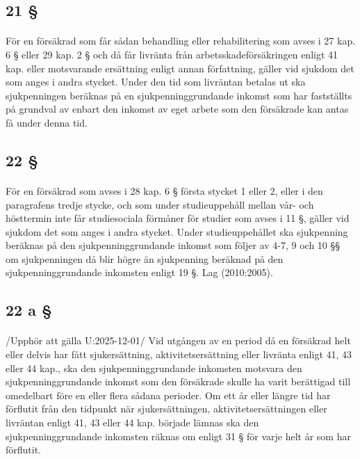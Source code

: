 \documentclass[a4paper,notitlepage,openany,10pt]{book}
\begin{document}
\subsection*{21 §}
\paragraph*{}
För en försäkrad som får sådan behandling eller rehabilitering som avses i 27 kap. 6 § eller 29 kap. 2 § och då får livränta från arbetsskadeförsäkringen enligt 41 kap.
eller motsvarande ersättning enligt annan författning, gäller vid sjukdom det som anges i andra stycket.
Under den tid som livräntan betalas ut ska sjukpenningen beräknas på en sjukpenninggrundande inkomst som har fastställts på grundval av enbart den inkomst av eget arbete som den försäkrade kan antas få under denna tid.
\subsection*{22 §}
\paragraph*{}
För en försäkrad som avses i 28 kap. 6 § första stycket 1 eller 2, eller i den paragrafens tredje stycke, och som under studieuppehåll mellan vår- och hösttermin inte får studiesociala förmåner för studier som avses i 11 §, gäller vid sjukdom det som anges i andra stycket.
Under studieuppehållet ska sjukpenning beräknas på den sjukpenninggrundande inkomst som följer av 4-7, 9 och 10 §§ om sjukpenningen då blir högre än sjukpenning beräknad på den sjukpenninggrundande inkomsten enligt 19 §.
Lag (2010:2005).
\subsection*{22 a §}
\paragraph*{}
/Upphör att gälla U:2025-12-01/
Vid utgången av en period då en försäkrad helt eller delvis har fått sjukersättning, aktivitetsersättning eller livränta enligt 41, 43 eller 44 kap., ska den sjukpenninggrundande inkomsten motsvara den sjukpenninggrundande inkomst som den försäkrade skulle ha varit berättigad till omedelbart före en eller flera sådana perioder. Om ett år eller längre tid har förflutit från den tidpunkt när sjukersättningen, aktivitetsersättningen eller livräntan enligt 41, 43 eller 44 kap. började lämnas ska den sjukpenninggrundande inkomsten räknas om enligt 31 § för varje helt år som har förflutit.
\end{document}
